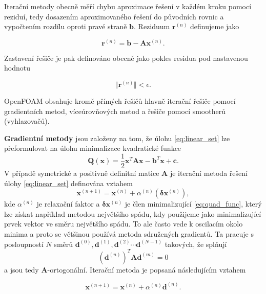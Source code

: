 \documentclass[a4paper,12pt]{report}
\theoremstyle{remark}
\begin{document}
	Iterační metody obecně měří chybu aproximace řešení v každém kroku pomocí reziduí, tedy dosazením aproximovaného řešení do původních rovnic a vypočtením rozdílu oproti pravé straně $\boldsymbol{b}$. Reziduum $\boldsymbol{r} ^{(n)} $ definujeme jako 

	\begin{equation}
		\boldsymbol{r} ^{(n)} = \boldsymbol{b}-\boldsymbol{A} \boldsymbol{x}^{(n)}.
		\label{eq:residuum}
	\end{equation} 

Zastavení řešiče je pak definováno obecně jako pokles residua pod nastavenou hodnotu

$$\Vert{\boldsymbol{r}^{(n)}}\Vert < \epsilon.$$
	
	OpenFOAM obsahuje kromě přímých řešičů hlavně iterační řešiče pomocí gradientních metod, víceúrovňových metod a řešiče pomocí smootherů (vyhlazovačů).
	
\textbf{Gradientní metody} jsou založeny na tom, že úlohu \ref{eq:linear_set} lze přeformulovat na úlohu minimalizace kvadratické funkce
\begin{equation}
	\boldsymbol{Q}(\boldsymbol{x}) = \frac{1}{2} \boldsymbol{x}^T \boldsymbol{A} \boldsymbol{x}-\boldsymbol{b}^T \boldsymbol{x} + \boldsymbol{c}.
	\label{eq:quad_func}
\end{equation}
V případě symetrické a positivně definitní matice $\boldsymbol{A}$ je iterační metoda řešení úlohy \ref{eq:linear_set} definována vztahem
\begin{equation}
	\boldsymbol{x}^{(n+1)} = \boldsymbol{x}^{(n)} + \alpha^{(n)} \left( \boldsymbol{\delta} \boldsymbol{x}^{(n)} \right),
	\label{eq:grad_iter}
\end{equation}
kde $\alpha^{(n)}$ je relaxační faktor a $\boldsymbol{\delta} \boldsymbol{x}^{(n)}$ je člen minimalizující \ref{eq:quad_func}, který lze získat například metodou největšího spádu, kdy použijeme jako minimalizující prvek vektor ve směru největšího spádu. To ale často vede k oscilacím okolo minima a proto se většinou používá metoda sdružených gradientů. Ta pracuje s posloupností $N$ směrů  $\boldsymbol{d}^{(0)}, \boldsymbol{d}^{(1)}, \boldsymbol{d}^{(2)} \cdots \boldsymbol{d}^{(N-1)}$ takových, že splňují
\begin{equation*}
	\left(\boldsymbol{d}^{(n)}\right)^T\boldsymbol{A} \boldsymbol{d}^{(m)} = 0
\end{equation*}
a jsou tedy $\boldsymbol{A}$-ortogonální. Iterační metoda je popsaná následujícím vztahem

\begin{equation*}
	\boldsymbol{x}^{(n+1)} = \boldsymbol{x}^{(n)} + \alpha^{(n)} \boldsymbol{d}^{(n)}.
	\label{eq:grad_cg}
\end{equation*}
\end{document}
